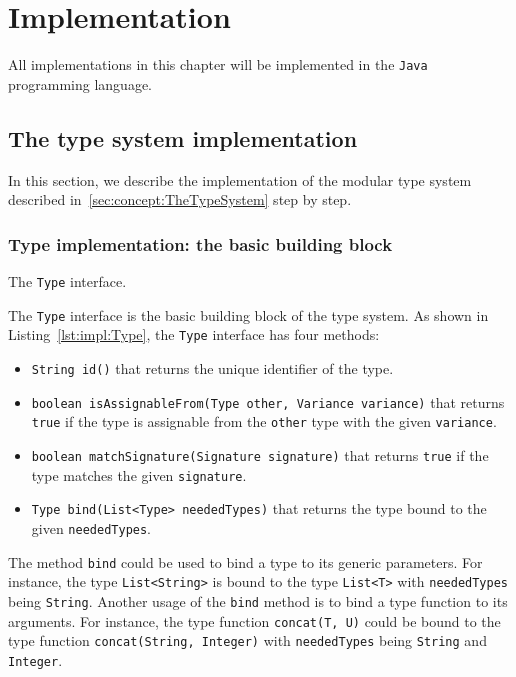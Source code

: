 \chapter{Implementation}\label{chap:Implementation}

All implementations in this chapter will be implemented in the \texttt{Java} programming language.

\section{The type system implementation}\label{sec:impl:TypeSystem}

In this section, we describe the implementation of the modular type system described in~\ref{sec:concept:TheTypeSystem} step by step.

\subsection{Type implementation: the basic building block}\label{sec:impl:Type}

\begin{Listing}[tb]
    \centering
    \caption{The \texttt{Type} interface.}
    \label{lst:impl:Type}
\end{Listing}

The \texttt{Type} interface is the basic building block of the type system. As shown in Listing~\ref{lst:impl:Type}, the \texttt{Type} interface has four methods:
\begin{itemize}
    \item \texttt{String id()} that returns the unique identifier of the type.
    \item \texttt{boolean isAssignableFrom(Type other, Variance variance)} that returns \texttt{true} if the type is assignable from the \texttt{other} type with the given \texttt{variance}.
    \item \texttt{boolean matchSignature(Signature signature)} that returns \texttt{true} if the type matches the given \texttt{signature}.
    \item \texttt{Type bind(List<Type> neededTypes)} that returns the type bound to the given \texttt{neededTypes}.
\end{itemize}

The method \texttt{bind} could be used to bind a type to its generic parameters. For instance, the type \texttt{List<String>} is bound to the type \texttt{List<T>} with \texttt{neededTypes} being \texttt{String}. Another usage of the \texttt{bind} method is to bind a type function to its arguments. For instance, the type function \texttt{concat(T, U)} could be bound to the type function \texttt{concat(String, Integer)} with \texttt{neededTypes} being \texttt{String} and \texttt{Integer}.

